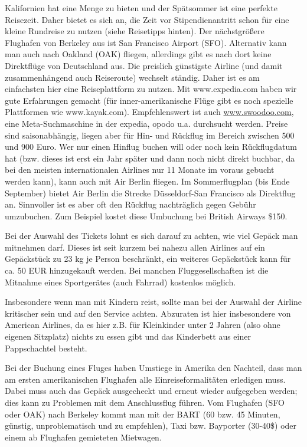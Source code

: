 \documentclass[a4paper]{scrreprt}
\begin{document}
Kalifornien hat eine Menge zu bieten und der Spätsommer ist eine perfekte Reisezeit. Daher bietet es sich an, die Zeit vor Stipendienantritt schon für eine kleine Rundreise zu nutzen (siehe Reisetipps hinten). Der nächstgrößere Flughafen von Berkeley aus ist San Francisco Airport (SFO). Alternativ kann man auch nach Oakland (OAK) fliegen, allerdings gibt es nach dort keine Direktflüge von Deutschland aus. Die preislich günstigste Airline (und damit zusammenhängend auch Reiseroute) wechselt ständig. Daher ist es am einfachsten hier eine Reiseplattform zu nutzen. Mit www.expedia.com haben wir gute Erfahrungen gemacht (für inner-amerikanische Flüge gibt es noch spezielle Plattformen wie  www.kayak.com). Empfehlenswert ist auch  \url{www.swoodoo.com}, eine Meta-Suchmaschine in der expedia, opodo u.a. durchsucht werden. Preise sind saisonabhängig, liegen aber für Hin- und Rückflug im Bereich zwischen 500 und 900 Euro. Wer nur einen Hinflug buchen will oder noch kein Rückflugdatum hat (bzw. dieses ist erst ein Jahr später und dann noch nicht direkt buchbar, da bei den meisten internationalen Airlines nur 11 Monate im voraus gebucht werden kann), kann auch mit Air Berlin fliegen. Im Sommerflugplan (bis Ende September) bietet Air Berlin die Strecke Düsseldorf-San Francisco als Direktflug an. Sinnvoller ist es aber oft den Rückflug nachträglich gegen Gebühr umzubuchen. Zum Beispiel kostet diese Umbuchung bei British Airways \$150. 

Bei der Auswahl des Tickets lohnt es sich darauf zu achten, wie viel Gepäck man mitnehmen darf. Dieses ist seit kurzem bei nahezu allen Airlines auf ein Gepäckstück zu 23 kg je Person beschränkt, ein weiteres Gepäckstück kann für ca. 50 EUR hinzugekauft werden. Bei manchen Fluggesellschaften ist die Mitnahme eines Sportgerätes (auch Fahrrad) kostenlos möglich.

Insbesondere wenn man mit Kindern reist, sollte man bei der Auswahl der Airline kritischer sein und auf den Service achten. Abzuraten ist hier insbesondere von American Airlines, da es hier z.B. für Kleinkinder unter 2 Jahren (also ohne eigenen Sitzplatz) nichts zu essen gibt und das Kinderbett aus einer Pappschachtel besteht.

Bei der Buchung eines Fluges haben Umstiege in Amerika den Nachteil, dass man am ersten amerikanischen Flughafen alle Einreiseformalitäten erledigen muss. Dabei muss auch das Gepäck ausgecheckt und erneut wieder aufgegeben werden; dies kann zu Problemen mit dem Anschlussflug führen. Vom Flughafen (SFO oder OAK) nach Berkeley kommt man mit der BART (60 bzw. 45 Minuten, günstig, unproblematisch und zu empfehlen), Taxi bzw. Bayporter (30-40\$) oder einem ab Flughafen gemieteten Mietwagen.
 
\end{document}
